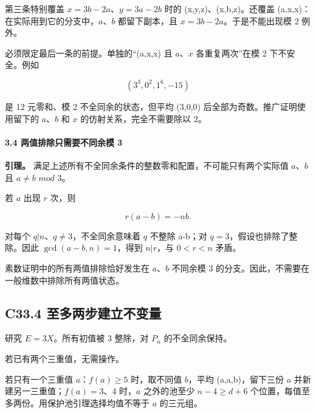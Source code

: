 {第三条特别覆盖} {\ensuremath{x=3b-2a}、\ensuremath{y=3a-2b}} {时的} {(x,y,z)、(x,b,z)。还覆盖} {(a,x,x)：在实际用到它的分支中，\ensuremath{a}、\ensuremath{b}} {都留下副本，且} {\ensuremath{x=3b-2a}。于是不能出现模} {2} {例外。}

{必须限定最后一条的前提。单独的``(a,x,x)} {且} {\ensuremath{a}、\ensuremath{x}} {各重复两次''在模} {2} {下不安全。例如}

\[
(3^3,0^2,1^6,-15)
\]

{是} {12} {元零和、模} {2} {不全同余的状态，但平均} {(3,0,0)} {后全部为奇数。推广证明使用留下的} {\ensuremath{a}、\ensuremath{b}} {和} {\ensuremath{x}} {的仿射关系，完全不需要除以} {2。}

\paragraph*{\texorpdfstring{{3.4} {两值排除只需要不同余模} {3}}{3.4 两值排除只需要不同余模 3}}\label{C33-h217}

\textbf{{引理。}} {满足上述所有不全同余条件的整数零和配置，不可能只有两个实际值} {\ensuremath{a}、\ensuremath{b}} {且} {\ensuremath{a\ne b}} {\ensuremath{mod}} {3。}

{若} {\ensuremath{a}} {出现} {\ensuremath{r}} {次，则}

\[
r(a-b)=-nb.
\]

{对每个} {\ensuremath{q|n}、\ensuremath{q\ne 3}，不全同余意味着} {\ensuremath{q}} {不整除} {a-b；对} {\ensuremath{q=3}，假设也排除了整除。因此} {\ensuremath{\operatorname{gcd}(a-b,n)=1}，得到} {\ensuremath{n|r}，与} {\ensuremath{0<r<n}} {矛盾。}

{素数证明中的所有两值排除恰好发生在} {\ensuremath{a}、\ensuremath{b}} {不同余模} {3} {的分支。因此，不需要在一般维数中排除所有两值状态。}

\subsection*{\texorpdfstring{{C33.4} {至多两步建立不变量}}{C33.4 至多两步建立不变量}}\label{C33-h218}

{研究} {\ensuremath{E=3X}。所有初值被} {3} {整除，对} {\ensuremath{P_{n}}} {的不全同余保持。}

{若已有两个三重值，无需操作。}

{若只有一个三重值} {\ensuremath{a}：\ensuremath{f(a)\ge 5}} {时，取不同值} {\ensuremath{b}，平均} {(a,a,b)，留下三份} {\ensuremath{a}} {并新建另一三重值；\ensuremath{f(a)=3}、4} {时，\ensuremath{a}} {之外的池至少} {\ensuremath{n-4\ge d+6}} {个位置，每值至多两份。用保护池引理选择均值不等于} {\ensuremath{a}} {的三元组。}

